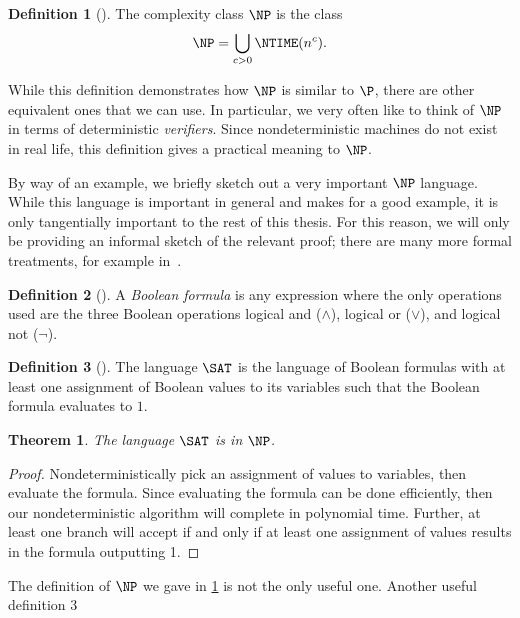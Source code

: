 \documentclass[english,12pt]{reedthesis}
\theoremstyle{plain}
\newtheorem{thm}{Theorem}[section]
\theoremstyle{definition}
\newtheorem{defn}[defn]{Definition}
\theoremstyle{remark}
\begin{document}
\begin{defn}[{\cite[Cor.\ 7.22]{Sip97}}]\label{def:np}
  The complexity class $\NP$ is the class
  \[
    \NP = \bigcup_{c > 0}\NTIME(n^{c}).
  \]
\end{defn}

While this definition demonstrates how $\NP$ is similar to $\P$, there are other
equivalent ones that we can use. In particular, we very often like to think of
$\NP$ in terms of deterministic \emph{verifiers}. Since nondeterministic
machines do not exist in real life, this definition gives a practical meaning to
$\NP$.

By way of an example, we briefly sketch out a very important $\NP$ language.
While this language is important in general and makes for a good example, it is
only tangentially important to the rest of this thesis. For this reason, we will
only be providing an informal sketch of the relevant proof; there are many more
formal treatments, for example in~\cite{Sip97}.

\begin{defn}[{\cite[299]{Sip97}}]\label{def:bool-formula}
  A \emph{Boolean formula} is any expression where the only operations used are
  the three Boolean operations logical and ($\wedge$), logical or ($\vee$), and logical
  not ($\neg$).
\end{defn}

\begin{defn}[{\cite[299]{Sip97}}]\label{def:sat}
  The language $\SAT$ is the language of Boolean formulas with at least one
  assignment of Boolean values to its variables such that the Boolean formula
  evaluates to $1$.
\end{defn}

\begin{thm}\label{thm:sat-is-np}
  The language $\SAT$ is in $\NP$.
\end{thm}

\begin{proof}
  Nondeterministically pick an assignment of values to variables, then evaluate
  the formula. Since evaluating the formula can be done efficiently, then our
  nondeterministic algorithm will complete in polynomial time. Further, at least
  one branch will accept if and only if at least one assignment of values
  results in the formula outputting 1.
\end{proof}

The definition of $\NP$ we gave in \cref{def:np} is not the only useful one.
Another useful definition 3
\end{document}
